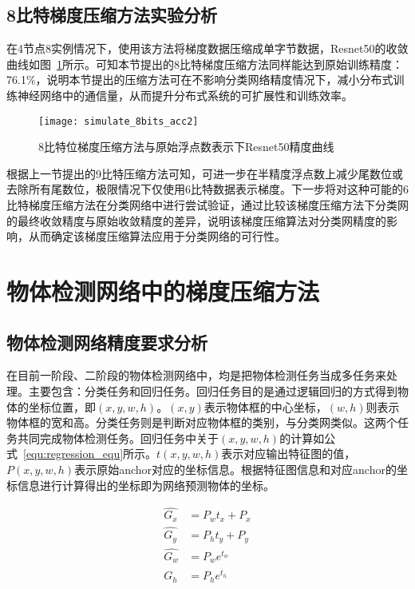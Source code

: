 \subsection{8比特梯度压缩方法实验分析}
在4节点8实例情况下，使用该方法将梯度数据压缩成单字节数据，Resnet50的收敛曲线如图~\ref{fig:simulate_8bits_acc}所示。可知本节提出的8比特梯度压缩方法同样能达到原始训练精度：76.1\%，说明本节提出的压缩方法可在不影响分类网络精度情况下，减小分布式训练神经网络中的通信量，从而提升分布式系统的可扩展性和训练效率。
\begin{figure}[htp]
\centering
\texttt{[image: simulate\_8bits\_acc2]}
\caption{8比特位梯度压缩方法与原始浮点数表示下Resnet50精度曲线}
\label{fig:simulate_8bits_acc}
\end{figure}

根据上一节提出的9比特压缩方法可知，可进一步在半精度浮点数上减少尾数位或去除所有尾数位，极限情况下仅使用6比特数据表示梯度。下一步将对这种可能的6比特梯度压缩方法在分类网络中进行尝试验证，通过比较该梯度压缩方法下分类网的最终收敛精度与原始收敛精度的差异，说明该梯度压缩算法对分类网精度的影响，从而确定该梯度压缩算法应用于分类网络的可行性。

\section{物体检测网络中的梯度压缩方法}
\subsection{物体检测网络精度要求分析}
在目前一阶段、二阶段的物体检测网络中，均是把物体检测任务当成多任务来处理。主要包含：分类任务和回归任务。回归任务目的是通过逻辑回归的方式得到物体的坐标位置，即$(x,y,w,h)$。$(x,y)$表示物体框的中心坐标，$(w,h)$则表示物体框的宽和高。分类任务则是判断对应物体框的类别，与分类网类似。这两个任务共同完成物体检测任务。回归任务中关于$(x,y,w,h)$的计算如公式~\ref{equ:regression_equ}所示。$t(x,y,w,h)$表示对应输出特征图的值，$P(x,y,w,h)$表示原始anchor对应的坐标信息。根据特征图信息和对应anchor的坐标信息进行计算得出的坐标即为网络预测物体的坐标。

\begin{equation}
\label{equ:regression_equ}
\begin{split}
\hat{G_{x}} &=P_{w}t_{x}+P_{x} \\
\hat{G_{y}} &=P_{h}t_{y}+P_{y} \\
\hat{G_{w}} &=P_{w}e^{t_{w}} \\
\hat{G_{h}} &=P_{h}e^{t_{h}} 
\end{split}
\end{equation}

